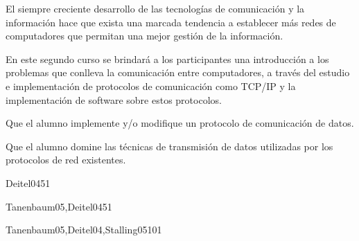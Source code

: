 \begin{syllabus}


\begin{justification}
El siempre creciente desarrollo de las tecnologías de comunicación y la
información hace que exista una marcada tendencia a  establecer
más redes de computadores que permitan una mejor
gestión de la información.

En este segundo curso se brindará a los participantes una introducción a los
problemas que conlleva la comunicación entre computadores, a través del
estudio e implementación de protocolos de comunicación como TCP/IP y
la implementación de software sobre estos protocolos.
\end{justification}

\begin{goals}
\item Que el alumno implemente y/o modifique un protocolo de comunicación de datos.
\item Que el alumno domine las técnicas de transmisión de datos utilizadas por los protocolos de red existentes.
\end{goals}

\begin{outcomes}
\end{outcomes}

\begin{unit}{\PFEventDrivenProgrammingDef}{Deitel04}{5}{1}
   \PFEventDrivenProgrammingAllTopics
   \begin{unitgoals}
      \item \PFEventDrivenProgrammingObjTWO
      \item \PFEventDrivenProgrammingObjTHREE
   \end{unitgoals}
\end{unit}

\begin{unit}{\NCNetworkSecurityDef}{Tanenbaum05,Deitel04}{5}{1}
        \NCNetworkSecurityAllTopics
        \NCNetworkSecurityAllObjectives
\end{unit}

\begin{unit}{\NCWebOrganizationDef}{Tanenbaum05,Deitel04,Stalling05}{10}{1}
        \NCWebOrganizationAllTopics
        \NCWebOrganizationAllObjectives
\end{unit}


\end{syllabus}
